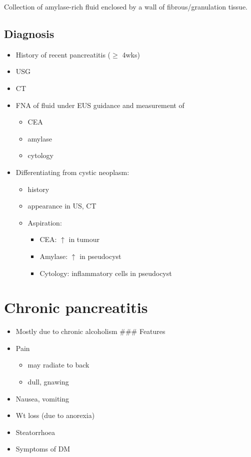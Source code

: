 \documentclass[
  14pt,
]{memoir}
\providecommand{\tightlist}{%
  \setlength{\itemsep}{0pt}\setlength{\parskip}{0pt}}
\begin{document}
Collection of amylase-rich fluid enclosed by a wall of
fibrous/granulation tissue.

\hypertarget{diagnosis}{%
\subsection{Diagnosis}\label{diagnosis}}

\begin{itemize}
\tightlist
\item
  History of recent pancreatitis (\(\ge\) 4wks)
\item
  USG
\item
  CT
\item
  FNA of fluid under EUS guidance and measurement of

  \begin{itemize}
  \tightlist
  \item
    CEA
  \item
    amylase
  \item
    cytology
  \end{itemize}
\item
  Differentiating from cystic neoplasm:

  \begin{itemize}
  \tightlist
  \item
    history
  \item
    appearance in US, CT
  \item
    Aspiration:

    \begin{itemize}
    \tightlist
    \item
      CEA: \(\uparrow\) in tumour
    \item
      Amylase: \(\uparrow\) in pseudocyst
    \item
      Cytology: inflammatory cells in pseudocyst
    \end{itemize}
  \end{itemize}
\end{itemize}

\pagebreak

\hypertarget{chronic-pancreatitis}{%
\section{Chronic pancreatitis}\label{chronic-pancreatitis}}

\begin{itemize}
\tightlist
\item
  Mostly due to chronic alcoholism \#\#\# Features
\item
  Pain

  \begin{itemize}
  \tightlist
  \item
    may radiate to back
  \item
    dull, gnawing
  \end{itemize}
\item
  Nausea, vomiting
\item
  Wt loss (due to anorexia)
\item
  Steatorrhoea
\item
  Symptoms of DM
\end{itemize}
\end{document}
